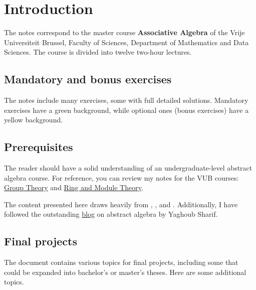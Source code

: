 \thispagestyle{plain}
\section*{Introduction}

The notes correspond to the master  
course \textbf{Associative Algebra} of the 
Vrije Universiteit Brussel, 
Faculty of Sciences, 
Department of Mathematics and Data Sciences. The course
is divided into twelve two-hour lectures. 

\subsection*{Mandatory and bonus exercises}

The notes include many exercises, some with full detailed solutions. Mandatory exercises have a \colorbox{green!5!white}{green background}, while optional ones (bonus exercises) have a \colorbox{yellow!15!white}{yellow background}.

\subsection*{Prerequisites}

The reader should have a solid understanding of an undergraduate-level abstract algebra course. For reference, you can review my notes for the VUB courses: \href{https://github.com/vendramin/group}{Group Theory} and \href{https://github.com/vendramin/rings}{Ring and Module Theory}.

The content presented here draws heavily from \cite{MR3308118}, \cite{MR1449137}, 
and \cite{MR798076}. Additionally, I have 
followed the outstanding \href{https://ysharifi.wordpress.com}{blog} on 
abstract algebra by Yaghoub Sharif.


\subsection*{Final projects} 

The document contains various topics for final projects, including some that could be expanded into bachelor's or master's theses. Here are some additional topics.



